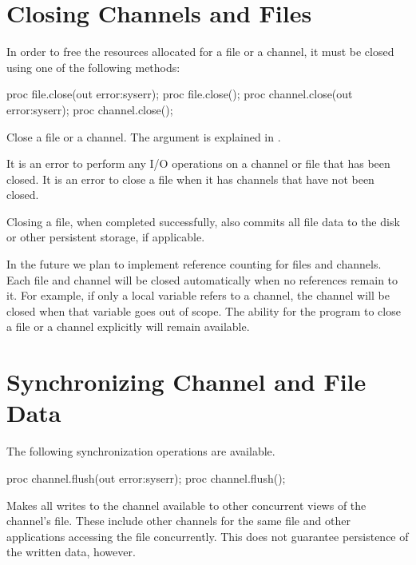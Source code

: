 \section{Closing Channels and Files}
\label{IO_closing_files_channels}

In order to free the resources allocated for a file or a channel, it
must be closed using one of the following methods:

\begin{protohead}
proc file.close(out error:syserr);
proc file.close();
proc channel.close(out error:syserr);
proc channel.close();
\end{protohead}
\begin{protobody}
Close a file or a channel.
The  argument is explained in .
\end{protobody}

It is an error to perform any I/O operations on a channel or file
that has been closed.
It is an error to close a file when it has channels that
have not been closed.

Closing a file, when completed successfully, also commits
all file data to the disk or other persistent storage,
if applicable.

\begin{future}
In the future we plan to implement reference counting for files
and channels. Each file and channel will be closed automatically
when no references remain to it. For example, if only a local
variable refers to a channel, the channel will be closed
when that variable goes out of scope.
The ability for the program to close a file or a channel
explicitly will remain available.
\end{future}


\section{Synchronizing Channel and File Data}
\label{IO_synchronization}

The following synchronization operations are available.

\begin{protohead}
proc channel.flush(out error:syserr);
proc channel.flush();
\end{protohead}
\begin{protobody}
Makes all writes to the channel available to other concurrent views of the
channel's file. These include other channels for the same file and
other applications accessing the file concurrently.
This does not guarantee persistence of the written data, however.
\end{protobody}


